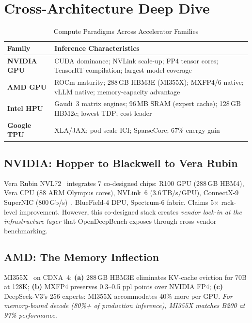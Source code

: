 \documentclass[conference,10pt]{IEEEtran}
\begin{document}
\section{Cross-Architecture Deep Dive}
\label{sec:arch}

\begin{table}[!htbp]
\caption{Compute Paradigms Across Accelerator Families}
\label{tab:archpara}
\centering\footnotesize
\begin{tabular}{@{}lp{5.2cm}@{}}
\toprule
\textbf{Family} & \textbf{Inference Characteristics} \\
\midrule
\textbf{NVIDIA GPU} & CUDA dominance; NVLink scale-up; FP4 tensor cores; TensorRT compilation; largest model coverage \\
\textbf{AMD GPU} & ROCm maturity; 288\,GB HBM3E (MI355X); MXFP4/6 native; vLLM native; memory-capacity advantage \\
\textbf{Intel HPU} & Gaudi~3 matrix engines; 96\,MB SRAM (expert cache); 128\,GB HBM2e; lowest TDP; cost leader \\
\textbf{Google TPU} & XLA/JAX; pod-scale ICI; SparseCore; 67\% energy gain \\
\bottomrule
\end{tabular}
\end{table}

\subsection{NVIDIA: Hopper to Blackwell to Vera Rubin}

Vera Rubin NVL72~\cite{nvidia2026verarubin} integrates 7 co-designed chips: R100 GPU (288\,GB HBM4), Vera CPU (88 ARM Olympus cores), NVLink~6 (3.6\,TB/s/GPU), ConnectX-9 SuperNIC (800\,Gb/s)~\cite{nvidia2026nvlink6}, BlueField-4 DPU, Spectrum-6 fabric. Claims 5$\times$ rack-level improvement. However, this co-designed stack creates \emph{vendor lock-in at the infrastructure layer} that OpenDeepBench exposes through cross-vendor benchmarking.

\subsection{AMD: The Memory Inflection}

MI355X~\cite{amd2025mi350} on CDNA~4: \textbf{(a)} 288\,GB HBM3E eliminates KV-cache eviction for 70B at 128K; \textbf{(b)} MXFP4 preserves 0.3--0.5 ppl points over NVIDIA FP4; \textbf{(c)} DeepSeek-V3's 256 experts: MI355X accommodates 40\% more per GPU. \emph{For memory-bound decode (80\%+ of production inference), MI355X matches B200 at 97\% performance.}
\end{document}
